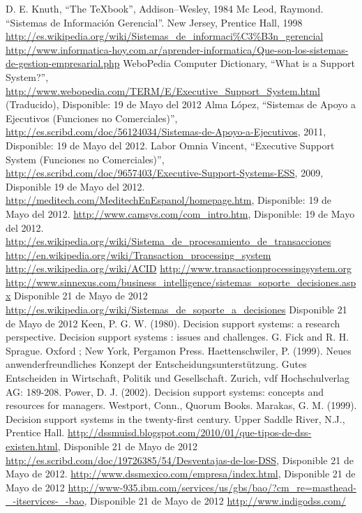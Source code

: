 \begin{thebibliography}{25}
	\bibitem {} D. E. Knuth, ``The TeXbook'', Addison--Wesley, 1984
	\bibitem {} Mc Leod, Raymond. ``Sistemas de Información Gerencial''. New Jersey, Prentice Hall, 1998
	\bibitem {} {\url{http://es.wikipedia.org/wiki/Sistemas_de_informaci%C3%B3n_gerencial}}
	\bibitem {} {\url{http://www.informatica-hoy.com.ar/aprender-informatica/Que-son-los-sistemas-de-gestion-empresarial.php}}
	\bibitem {} WeboPedia Computer Dictionary, ``What is a Support System?'', {\url{ http://www.webopedia.com/TERM/E/Executive_Support_System.html}} (Traducido), Disponible: 19 de Mayo del 2012
	\bibitem {} Alma López, ``Sistemas de Apoyo a Ejecutivos (Funciones no Comerciales)'',{\url{ http://es.scribd.com/doc/56124034/Sistemas-de-Apoyo-a-Ejecutivos}}, 2011, Disponible: 19 de Mayo del 2012.
	\bibitem {} Labor Omnia Vincent, ``Executive Support System (Funciones no Comerciales)'', {\url{http://es.scribd.com/doc/9657403/Executive-Support-Systems-ESS}}, 2009, Disponible 19 de Mayo del 2012.
	\bibitem {} {\url{http://meditech.com/MeditechEnEspanol/homepage.htm}}, Disponible: 19 de Mayo del 2012.
	\bibitem {} {\url{http://www.camsys.com/com_intro.htm}}, Disponible: 19 de Mayo del 2012.
	\bibitem {} {\url{http://es.wikipedia.org/wiki/Sistema_de_procesamiento_de_transacciones}}
	\bibitem {} {\url{http://en.wikipedia.org/wiki/Transaction_processing_system}}
	\bibitem {} {\url{http://es.wikipedia.org/wiki/ACID}}
	\bibitem {} {\url{http://www.transactionprocessingsystem.org}}
	\bibitem {} {\url{http://www.sinnexus.com/business_intelligence/sistemas_soporte_decisiones.aspx}} Disponible 21 de Mayo de 2012
	\bibitem {} {\url{http://es.wikipedia.org/wiki/Sistemas_de_soporte_a_decisiones}} Disponible 21 de Mayo de 2012
	\bibitem {} Keen, P. G. W. (1980). Decision support systems: a research perspective. Decision support systems : issues and challenges. G. Fick and R. H. Sprague. Oxford ; New York, Pergamon Press.
	\bibitem {} Haettenschwiler, P. (1999). Neues anwenderfreundliches Konzept der Entscheidungsunterstützung. Gutes Entscheiden in Wirtschaft, Politik und Gesellschaft. Zurich, vdf Hochschulverlag AG: 189-208.
	\bibitem {} Power, D. J. (2002). Decision support systems: concepts and resources for managers. Westport, Conn., Quorum Books.
	\bibitem {} Marakas, G. M. (1999). Decision support systems in the twenty-first century. Upper Saddle River, N.J., Prentice Hall.
	\bibitem {} {\url{http://dssmuisd.blogspot.com/2010/01/que-tipos-de-dss-existen.html}}, Disponible 21 de Mayo de 2012
	\bibitem {} {\url{http://es.scribd.com/doc/19726385/54/Desventajas-de-los-DSS}}, Disponible 21 de Mayo de 2012.
	\bibitem {} {\url{http://www.dssmexico.com/empresa/index.html}}, Disponible 21 de Mayo de 2012
	\bibitem {} {\url{http://www-935.ibm.com/services/us/gbs/bao/?cm_re=masthead-_-itservices-_-bao}}, Disponible 21 de Mayo de 2012
	\bibitem {} {\url{http://www.indigodss.com/}}
\end{thebibliography}
